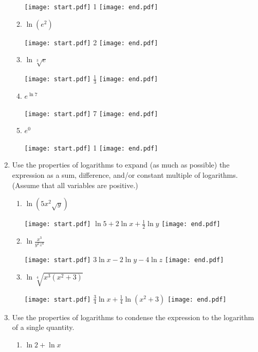 \documentclass[12pt]{article}
\begin{document}
\begin{enumerate}
\begin{enumerate}
\texttt{[image: start.pdf]}
{1}
\texttt{[image: end.pdf]}


\item $\ln(e^2)$

\texttt{[image: start.pdf]}
{2}
\texttt{[image: end.pdf]}


\item $\ln{\sqrt[3]{e}}$

\texttt{[image: start.pdf]}
{$\frac{1}{3}$}
\texttt{[image: end.pdf]}


\item $e^{\ln{7}}$

\texttt{[image: start.pdf]}
{7}
\texttt{[image: end.pdf]}


\item $e^0$

\texttt{[image: start.pdf]}
{1}
\texttt{[image: end.pdf]}


\end{enumerate}

\item Use the properties of logarithms to expand (as much as possible) the expression as a sum, difference, and/or constant multiple of logarithms.  (Assume that all variables are positive.)

\begin{enumerate}

\item $\displaystyle \ln{(5x^{2}\sqrt{y})}$

\texttt{[image: start.pdf]}
{$\displaystyle \ln{5}+2\ln{x}+\frac{1}{2}\ln{y}$}
\texttt{[image: end.pdf]}


\item $\displaystyle \ln{\frac{x^3}{y^2z^4}}$

\texttt{[image: start.pdf]}
{$\displaystyle 3\ln{x}-2\ln{y}-4\ln{z}$}
\texttt{[image: end.pdf]}


\item $\displaystyle \ln{\sqrt[4]{x^{3}(x^{2}+3)}}$

\texttt{[image: start.pdf]}
{$\displaystyle \frac{3}{4}\ln{x}+\frac{1}{4}\ln{(x^{2}+3)}$}
\texttt{[image: end.pdf]}


\end{enumerate}

\item Use the properties of logarithms to condense the expression to the logarithm of a single quantity.

\begin{enumerate}

\item $\displaystyle \ln{2}+\ln{x}$


\end{enumerate}
\end{enumerate}
\end{document}
